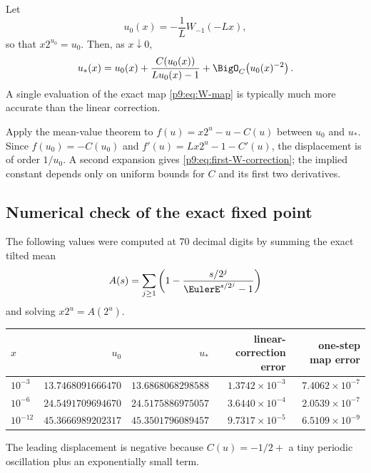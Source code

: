 \documentclass[11pt]{article}
\numberwithin{equation}{section}
\theoremstyle{definition}
\theoremstyle{remark}
\begin{document}
\begin{corollary}
Let
\begin{equation}
 u_0(x)=-\frac1L W_{-1}(-Lx),                              \label{p9:eq:u0}
\end{equation}
so that $x2^{u_0}=u_0$.  Then, as $x\downarrow0$,
\begin{equation}
 u_*(x)=u_0(x)+\frac{C(u_0(x))}{Lu_0(x)-1}
 +\BigO_C\!\left(u_0(x)^{-2}\right).                       \label{p9:eq:first-W-correction}
\end{equation}
A single evaluation of the exact map \eqref{p9:eq:W-map} is typically much more accurate than
the linear correction.
\end{corollary}

\begin{proofidea}
Apply the mean-value theorem to
$f(u)=x2^u-u-C(u)$ between $u_0$ and $u_*$.  Since
$f(u_0)=-C(u_0)$ and $f'(u)=Lx2^u-1-C'(u)$, the displacement is of order $1/u_0$.
A second expansion gives \eqref{p9:eq:first-W-correction}; the implied constant depends only on uniform bounds for $C$ and its first two derivatives.
\end{proofidea}

\subsection{Numerical check of the exact fixed point}
The following values were computed at 70 decimal digits by summing the exact tilted mean
\[
 A(s)=\sum_{j\ge1}\left(1-\frac{s/2^j}{\EulerE^{s/2^j}-1}\right)
\]
and solving $x2^u=A(2^u)$.
\begin{center}
\small
\begin{tabular}{@{}lrrrr@{}}
\toprule
$x$ & $u_0$ & $u_*$ & linear-correction error & one-step map error\\
\midrule
$10^{-3}$
& $13.7468091666470$ & $13.6868068298588$
& $1.3742\times10^{-3}$ & $7.4062\times10^{-7}$\\
$10^{-6}$
& $24.5491709694670$ & $24.5175886975057$
& $3.6440\times10^{-4}$ & $2.0539\times10^{-7}$\\
$10^{-12}$
& $45.3666989202317$ & $45.3501796089457$
& $9.7317\times10^{-5}$ & $6.5109\times10^{-9}$\\
\bottomrule
\end{tabular}
\end{center}
The leading displacement is negative because $C(u)=-1/2+$ a tiny periodic oscillation plus
an exponentially small term.
\end{document}
